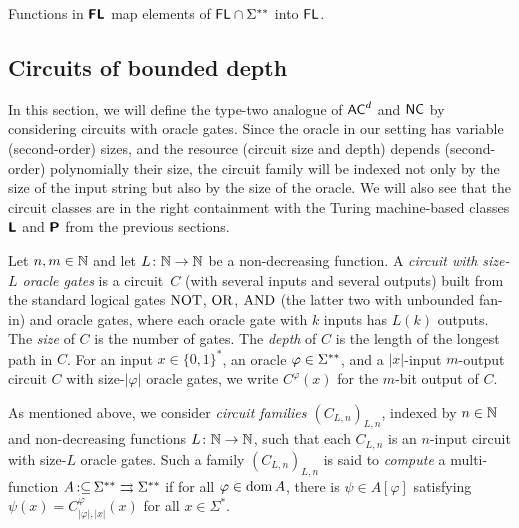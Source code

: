 \documentclass[a4paper,UKenglish]{lipics}
\newcommand{\pcolon}{\mathpunct{\,:\subseteq}}
\begin{document}
\begin{lemma}
\label{lemma:Ltwo-maps-L-to-L}
 Functions in $\text{\bfseries \sffamily \upshape FL}$ map 
 elements of $\mathsf{FL} \cap \Sigma ^{**}$
 into $\mathsf{FL}$.
\end{lemma}


\subsection{Circuits of bounded depth}

In this section, we will define the type-two analogue of $\mathsf{AC} ^d$ and $\mathsf{NC}$ 
by considering circuits with oracle gates.
Since the oracle in our setting has variable (second-order) sizes, 
and the resource (circuit size and depth) 
depends (second-order) polynomially their size, 
the circuit family will be 
indexed not only by the size of the input string
but also by the size of the oracle. 
We will also see that the circuit classes are 
in the right containment with the 
Turing machine-based classes $\text{\bfseries \sffamily \upshape L}$ and $\text{\bfseries \sffamily \upshape P}$
from the previous sections. 

Let $n, m \in \mathbb N$ and let $L \colon \mathbb N \to \mathbb N$ be a non-decreasing function.
A \emph{circuit with size-$L$ oracle gates} is a circuit~$C$ 
(with several inputs and several outputs)
built from
the standard logical gates $\mathrm{NOT}$, $\mathrm{OR}$, $\mathrm{AND}$ (the latter two with unbounded fan-in) 
and oracle gates, 
where each oracle gate with $k$ inputs has $L (k)$ outputs.
The \emph{size} of $C$ is the number of gates.
The \emph{depth} of $C$ is the length of the longest path in $C$.
For an input $x \in \{0, 1\} ^*$, an oracle $\varphi \in \Sigma ^{**}$, 
and a $|x|$-input $m$-output circuit $C$ with size-$|\varphi|$ oracle gates, 
we write $C^\varphi(x)$ for the $m$-bit output of $C$.

As mentioned above,
we consider \emph{circuit families $(C_{L,n})_{L,n}$}, 
indexed by $n \in \mathbb N$ and non-decreasing functions $L \colon \mathbb N \to \mathbb N$,
such that each $C_{L, n}$ is an $n$-input circuit with size-$L$ oracle gates.
Such a family $(C_{L,n})_{L,n}$ is said to
\emph{compute} a multi-function $A \pcolon \LM \rightrightarrows \LM$ if 
for all $\varphi \in \mathop{\rm dom} A$, there is $\psi \in A[\varphi]$ 
satisfying $\psi(x) = C_{|\varphi|, |x|}^\varphi(x)$ for all $x \in \Sigma^*$.
\end{document}
